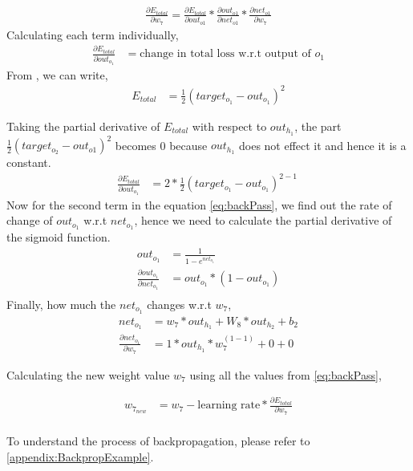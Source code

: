 \begin{align}
    \frac{\partial E_{total}}{\partial w_{7}} = \frac{\partial E_{total}}{\partial out_{o1}} * \frac{\partial out_{o1}}{\partial net_{o1}} * \frac{\partial net_{o1}}{\partial w_{7}} \label{eq:backPass}
\end{align}
Calculating each term individually,
\begin{align}
    \frac{\partial E_{total} }{\partial out_{o_{1}}} &= \text{change in total loss w.r.t output of $o_{1}$}
\end{align}
From , we can write,
\begin{align}
    E_{total} &= \frac{1}{2}(target_{o_{1}} - out_{o_{1}})^{2}
\end{align}

Taking the partial derivative of $E_{total}$ with respect to $out_{h_{1}}$, the part $\frac{1}{2}(target_{o_{2}} - out_{o{1}})^{2}$ becomes 0 because $out_{h_{1}}$ does not effect it and hence it is a constant.
\begin{align}
    \frac{\partial E_{total}}{\partial out_{o_{1}}} &= 2 * \frac{1}{2}(target_{o_{1}} - out_{o_{1}})^{2 - 1} \
\end{align}
Now for the second term in the equation \ref{eq:backPass}, we find out the rate of change of $out_{o_{1}}$ w.r.t $net_{o_{1}}$, hence we need to calculate the partial derivative of the sigmoid function. 
\begin{align}
    out_{o_{1}} &= \frac{1}{1-e^{net_{o_{1}}}}\\
    \frac{\partial out_{o_{1}}}{\partial net_{o_{1}}} &=  out_{o_{1}}*(1-out_{o_{1}}) \\
\end{align}
Finally, how much the $net_{o_{1}}$ changes w.r.t $w_{7}$,
\begin{align}
    net_{o_{1}} &= w_{7} * out_{h_{1}} + W_{8} * out_{h_{2}} + b_{2}   \\
    \frac{\partial net_{o_{1}}}{\partial w_{7}} &=  1 * out_{h_{1}} * w_{7}^{(1 - 1)} + 0 + 0
\end{align}

Calculating the new weight value $w_{7}$ using all the values from \ref{eq:backPass}, 

\begin{align}
    w_{7_{new}} &= w_{7} -\text{learning rate} * \frac{\partial E_{total}}{\partial w_{7}} \\ 
\end{align}

To understand the process of backpropagation, please refer to \ref{appendix:BackpropExample}.


